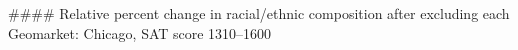 #### Relative percent change in racial/ethnic composition after excluding each Geomarket: Chicago, SAT score 1310–1600
